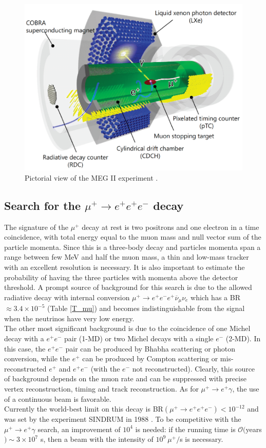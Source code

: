 \documentclass[12pt,a4paper,openright, oneside, titlepage]{book} %
\begin{document}
\begin{figure}[!htb]
\centering
\includegraphics[scale=0.8]{MEG_II}
\caption[MEG II experiment]{Pictorial view of the MEG II experiment \cite{MEG_II}.}
\label{_MEG_II}
\end{figure}

\subsection{Search for the $\mu^+ \rightarrow e^+ e^+e^-$ decay}
The signature of the $\mu^+$ decay at rest is two positrons and one electron in a time coincidence, with total energy equal to the muon mass and null vector sum of the particle momenta.
Since this is a three-body decay and particles momenta span a range between few MeV and half the muon mass, a thin and low-mass tracker with an excellent resolution is necessary.
It is also important to estimate the probability of having the three particles with momenta above the detector threshold.
A prompt source of background for this search is due to the allowed radiative decay with internal conversion $\mu^+\rightarrow e^+e^-e^+\overline{\nu}_{\mu}\nu_e$ which has a BR$\approx 3.4\times 10^{-5}$ (Table \ref{T_mu}) and becomes indistinguishable from the signal when the neutrinos have very low energy. \\
The other most significant background is due to the coincidence of one Michel decay with a $e^+e^-$ pair (1-MD) or two Michel decays with a single $e^-$ (2-MD). 
In this case, the $e^+e^-$ pair can be produced by Bhabha scattering or photon conversion, while the $e^+$ can be produced by Compton scattering or mis-reconstructed $e^+$ and $e^+e^-$ (with the $e^-$ not reconstructed). 
Clearly, this source of background depends on the muon rate and can be suppressed with precise vertex reconstruction, timing and track reconstruction.
As for $\mu^+ \rightarrow e^+ \gamma$, the use of a continuous beam is favorable.\\
Currently the world-best limit on this decay is BR$(\mu^+ \rightarrow e^+ e^+e^-)<10^{-12}$ and was set by the experiment SINDRUM in 1988 \cite{SINDRUM}.
To be competitive with the $\mu^+\rightarrow e^+\gamma$ search, an improvement of $10^4$ is needed: if the running time is $\mathcal{O}($years$)\sim 3\times 10^7$ s, then a beam with the intensity of $10^9\ \mu^+/$s is necessary.
\end{document}
